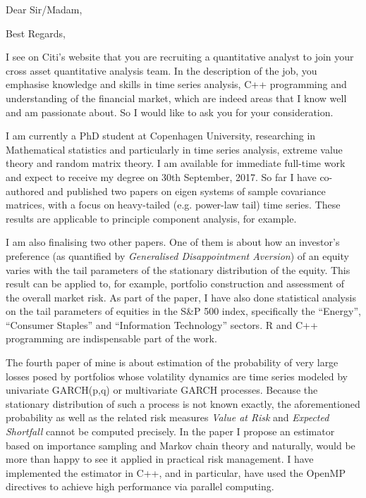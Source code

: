 \documentclass[10pt,a4paper, gentium]{moderncv}        %
\begin{document}
\date{\today}
\opening{Dear Sir/Madam,}
\closing{Best Regards,}
\makelettertitle

I see on Citi's website that you are recruiting a quantitative
analyst to join your cross asset quantitative analysis team. In the
description of the job, you emphasise knowledge and skills in time
series analysis, C++ programming and understanding of the financial
market, which are indeed areas that I know well and am passionate
about. So I would like to ask you for your consideration.

I am currently a PhD student at Copenhagen University, researching in
Mathematical statistics and particularly in time series analysis,
extreme value theory and random matrix theory. I am available for
immediate full-time work and expect to receive my degree on 30th
September, 2017. So far I have co-authored and published two papers on
eigen systems of sample covariance matrices, with a focus on
heavy-tailed (e.g. power-law tail) time series. These results are
applicable to principle component analysis, for example.

I am also finalising two other papers. One of them is about how an
investor's preference (as quantified by {\em Generalised
  Disappointment Aversion}) of an equity varies with the tail
parameters of the stationary distribution of the equity. This
result can be applied to, for example, portfolio construction and
assessment of the overall market risk. As part of the paper, I have
also done statistical analysis on the tail parameters of equities in
the S\&P 500 index, specifically the ``Energy'', ``Consumer Staples''
and ``Information Technology'' sectors. R and C++ programming are
indispensable part of the work.

The fourth paper of mine is about estimation of the probability of very
large losses posed by portfolios whose volatility dynamics are
time series modeled by univariate GARCH(p,q) or multivariate
GARCH processes. Because the stationary distribution of such a process
is not known exactly, the aforementioned probability as well as the
related risk measures {\em Value at Risk} and {\em Expected
  Shortfall} cannot be computed precisely. In the paper I propose 
an estimator based on importance sampling and Markov chain theory and
naturally, would be more than happy to see it applied in practical
risk management. I have implemented the estimator in C++, and in
particular, have used the OpenMP directives to achieve high
performance via parallel computing.
\end{document}
